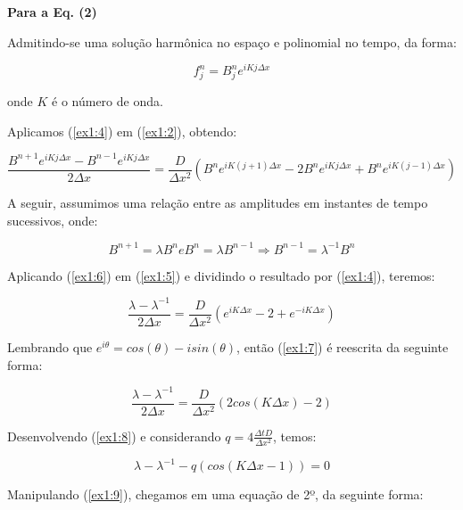 \documentclass[11pt]{article}
\begin{document}
\textbf{Para a Eq. (2)}

Admitindo-se uma solução harmônica no espaço e polinomial no tempo, da
forma:

\begin{equation}
    f^{n}_{j} = B^{n}_{j}e^{iKj\Delta{x}}
    \label{ex1:4}
\end{equation}

onde \(K\) é o número de onda.

Aplicamos (\ref{ex1:4}) em (\ref{ex1:2}), obtendo:

\begin{equation}
    \frac{B^{n+1}e^{iKj\Delta{x}} - B^{n-1}e^{iKj\Delta{x}} }{2\Delta{x}} = \frac{D}{\Delta{x^2}}(B^{n}e^{iK(j+1)\Delta{x}} - 2B^{n}e^{iKj\Delta{x}} + B^{n}e^{iK(j-1)\Delta{x}})
    \label{ex1:5}
\end{equation}

A seguir, assumimos uma relação entre as amplitudes em instantes de
tempo sucessivos, onde:

\begin{equation}
    B^{n+1} = \lambda B^{n} e B^{n} = \lambda B^{n-1} \Rightarrow B^{n-1} = \lambda^{-1}B^n
    \label{ex1:6}
\end{equation}

Aplicando (\ref{ex1:6}) em (\ref{ex1:5}) e dividindo o resultado por
(\ref{ex1:4}), teremos:

\begin{equation}
    \frac{\lambda - \lambda^{-1}}{2\Delta{x}} = \frac{D}{\Delta{x^2}}(e^{iK\Delta{x}} - 2 + e^{-iK\Delta{x}})
    \label{ex1:7}
\end{equation}

Lembrando que \(e^{i\theta} = cos(\theta) - isin(\theta)\), então
(\ref{ex1:7}) é reescrita da seguinte forma:

\begin{equation}
    \frac{\lambda - \lambda^{-1}}{2\Delta{x}} = \frac{D}{\Delta{x^2}}(2cos(K\Delta{x}) - 2)
    \label{ex1:8}
\end{equation}

Desenvolvendo (\ref{ex1:8}) e considerando
\(q = 4\frac{\Delta{t}D}{\Delta{x^2}}\), temos:

\begin{equation}
    \lambda - \lambda^{-1} - q(cos(K\Delta{x} -1)) = 0
    \label{ex1:9}
\end{equation}

Manipulando (\ref{ex1:9}), chegamos em uma equação de 2º, da seguinte
forma:
\end{document}
